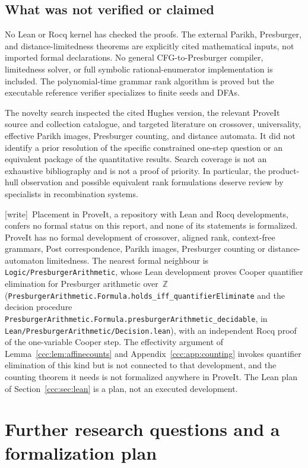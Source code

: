 \documentclass[11pt,letterpaper]{article}
\theoremstyle{definition}
\theoremstyle{remark}
\newcommand{\wtag}{\textup{[write]}}
\begin{document}
\subsection{What was not verified or claimed}

No Lean or Rocq kernel has checked the proofs. The external Parikh, Presburger,
and distance-limitedness theorems are explicitly cited mathematical inputs,
not imported formal declarations. No general CFG-to-Presburger compiler,
limitedness solver, or full symbolic rational-enumerator implementation is
included. The polynomial-time grammar rank algorithm is proved but the
executable reference verifier specializes to finite seeds and DFAs.

The novelty search inspected the cited Hughes version, the relevant ProveIt
source and collection catalogue, and targeted literature on crossover,
universality, effective Parikh images, Presburger counting, and distance
automata. It did not identify a prior resolution of the specific constrained
one-step question or an equivalent package of the quantitative results.
Search coverage is not an exhaustive bibliography and is not a proof of
priority. In particular, the product-hull observation and possible equivalent
rank formulations deserve review by specialists in recombination systems.

\wtag\ Placement in ProveIt, a repository with Lean and Rocq developments,
confers no formal status on this report, and none of its statements is
formalized. ProveIt has no formal development of crossover, aligned rank,
context-free grammars, Post correspondence, Parikh images, Presburger
counting or distance-automaton limitedness. The nearest formal neighbour is
\texttt{Logic/PresburgerArithmetic}, whose Lean development proves Cooper
quantifier elimination for Presburger arithmetic over~$\mathbb Z$
(\texttt{PresburgerArithmetic.Formula.holds\_iff\_quantifierEliminate} and the
decision procedure
\texttt{PresburgerArithmetic.Formula.presburgerArithmetic\_decidable}, in
\texttt{Lean/PresburgerArithmetic/Decision.lean}), with an independent Rocq
proof of the one-variable Cooper step. The effectivity argument of
Lemma~\ref{ccc:lem:affinecounts} and Appendix~\ref{ccc:app:counting} invokes
quantifier elimination of this kind but is not connected to that development,
and the counting theorem it needs is not formalized anywhere in ProveIt. The
Lean plan of Section~\ref{ccc:sec:lean} is a plan, not an executed
development.

\section{Further research questions and a formalization plan}
\label{ccc:sec:questions}
\end{document}
